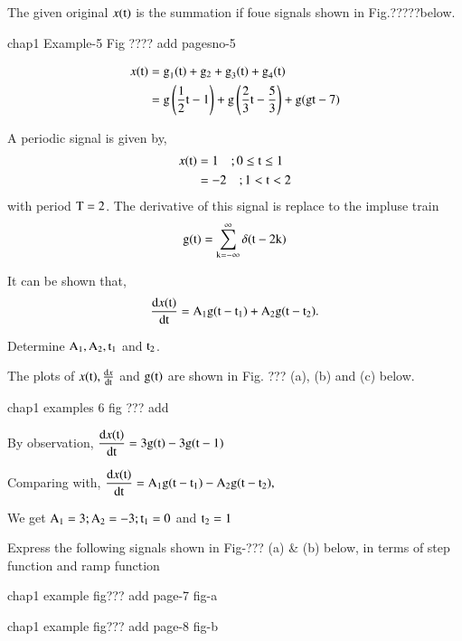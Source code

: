 \begin{solution}
The given original $x(\textrm{t})$ is the summation if foue signals shown in Fig.?????below.
\begin{center}
chap1 Example-5 Fig ???? add pagesno-5
\end{center}
\begin{align*}
x(\textrm{t}) &= \textrm{g}_{1}(\textrm{t}) + \rm{g_{2}} + {\textrm{g}_{3}}(\textrm{t}) + {\textrm{g}_{4}}(\textrm{t})\\
        &= \textrm{g} \left(\dfrac{1}{2}\textrm{t}-1\right) + \textrm{g}\left(\dfrac{2}{3}\textrm{t} - \dfrac{5}{3}\right) + \textrm{g}(\textrm{g}\textrm{t}-7)
\end{align*}
\end{solution}

\begin{exam*}
A periodic signal is given by,
\begin{align*}
x(\textrm{t}) &=1 \quad ; 0 \leq \textrm{t} \leq 1\\
        &=-2 \quad ; 1< \textrm{t} < 2 
\end{align*}
with period $\textrm{T} =2$. The derivative of this signal is replace to the impluse train
$$
\textrm{g}(\textrm{t}) =\sum_{\textrm{k}=-\infty}^{\infty} \delta(\textrm{t}-2\textrm{k})
$$

It can be shown that,
$$
\dfrac{\textrm{d} x(\textrm{t})}{\operatorname{dt}}  = \textrm{A}_{1}\textrm{g}(\textrm{t}-\textrm{t}_{1}) + \textrm{A}_{2}\textrm{g}(\textrm{t}-\textrm{t}_{2}).
$$

Determine $\textrm{A}_{1}, \textrm{A}_{2}, \textrm{t}_{1}$ and $\textrm{t}_{2}$.
\end{exam*}

\begin{solution}
The plots of $x(\textrm{t}), \frac{\textrm{d} x}{\textrm{d} \textrm{t}}$ and $\textrm{g}(\textrm{t})$ are shown in Fig. ??? (a), (b) and (c) below.
\begin{center}
chap1 examples 6 fig ??? add
\end{center}

By observation, $\dfrac{\textrm{d} x(\textrm{t})}{\textrm{d} \textrm{t}} = 3 \textrm{g}(\textrm{t})-3\textrm{g}(\textrm{t}-1)$

\medskip
Comparing with, $\dfrac{\textrm{d} x(\textrm{t})}{\textrm{d} \textrm{t}} = \textrm{A}_{1}\textrm{g}(\textrm{t}-\textrm{t}_{1})-\textrm{A}_{2}\textrm{g}(\textrm{t}-\textrm{t}_{2}),$

\medskip
We get $\textrm{A}_{1} =3 ; \textrm{A}_{2}=-3 ; \textrm{t}_{1}=0$ and $\textrm{t}_{2}=1$
\end{solution}

\begin{exam*}
Express the following signals shown in Fig-??? (a) \& (b) below, in terms of step function and ramp function
\begin{center}
chap1 example fig??? add page-7 fig-a 
\end{center}

\begin{center}
chap1 example fig??? add page-8 fig-b
\end{center}
\end{exam*}

